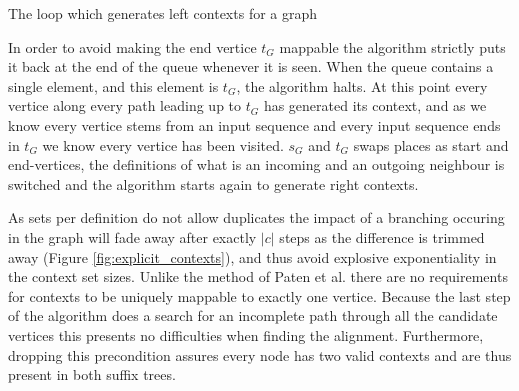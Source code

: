 \documentclass[thesis.tex]{subfiles}
\begin{document}
\begin{center}
  \begin{algorithm}[!t]
    \begin{mdframed}
    \end{mdframed}
    \caption{The loop which generates left contexts for a graph}
  \end{algorithm}
\end{center}
\par\noindent
In order to avoid making the end vertice $t_G$ mappable the algorithm strictly puts it back at the end of the queue whenever it is seen. When the queue contains a single element, and this element is $t_G$, the algorithm halts. At this point every vertice along every path leading up to $t_G$ has generated its context, and as we know every vertice stems from an input sequence and every input sequence ends in $t_G$ we know every vertice has been visited. $s_G$ and $t_G$ swaps places as start and end-vertices, the definitions of what is an incoming and an outgoing neighbour is switched and the algorithm starts again to generate right contexts.\\
\par\noindent
As sets per definition do not allow duplicates the impact of a branching occuring in the graph will fade away after exactly $|c|$ steps as the difference is trimmed away (Figure \ref{fig:explicit_contexts}), and thus avoid explosive exponentiality in the context set sizes. Unlike the method of Paten et al. \cite{mapping_to_a_reference_genome_structure} there are no requirements for contexts to be uniquely mappable to exactly one vertice. Because the last step of the algorithm does a search for an incomplete path through all the candidate vertices this presents no difficulties when finding the alignment. Furthermore, dropping this precondition assures every node has two valid contexts and are thus present in both suffix trees.\\
\end{document}
